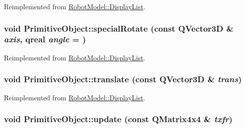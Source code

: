 Reimplemented from \hyperlink{class_robot_model_1_1_display_list_a6c9c1298e237ab25037ad9d7163b118c}{RobotModel::DisplayList}.\hypertarget{class_robot_model_1_1_primitive_object_a07ece283ed8f0f0e3cdf6f36ac7b34dd}{
\subsubsection[{specialRotate}]{\setlength{\rightskip}{0pt plus 5cm}void PrimitiveObject::specialRotate (const QVector3D \& {\em axis}, \/  qreal {\em angle} = {})}}
\label{class_robot_model_1_1_primitive_object_a07ece283ed8f0f0e3cdf6f36ac7b34dd}


Reimplemented from \hyperlink{class_robot_model_1_1_display_list_abd15964fcf47dbfdcb06d89517871152}{RobotModel::DisplayList}.\hypertarget{class_robot_model_1_1_primitive_object_ae41a1dcacd77b59c44409a77b0183a77}{
\subsubsection[{translate}]{\setlength{\rightskip}{0pt plus 5cm}void PrimitiveObject::translate (const QVector3D \& {\em trans})}}
\label{class_robot_model_1_1_primitive_object_ae41a1dcacd77b59c44409a77b0183a77}


Reimplemented from \hyperlink{class_robot_model_1_1_display_list_a6eb574d1f9929d9e2141dbacdeeb1b6a}{RobotModel::DisplayList}.\hypertarget{class_robot_model_1_1_primitive_object_ac87b33448b7e82dddbca79f57ea8cbb5}{
\subsubsection[{update}]{\setlength{\rightskip}{0pt plus 5cm}void PrimitiveObject::update (const QMatrix4x4 \& {\em txfr})}}
\label{class_robot_model_1_1_primitive_object_ac87b33448b7e82dddbca79f57ea8cbb5}


